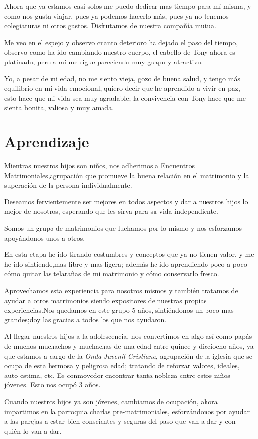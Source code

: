 \documentclass[letterpaper, 12pt]{book}
\begin{document}
Ahora que ya estamos casi solos me puedo dedicar mas tiempo para mí misma, y como nos gusta viajar, pues ya podemos hacerlo más, pues ya no tenemos colegiaturas ni otros gastos. Disfrutamos de nuestra compañía mutua.

Me veo en el espejo y observo cuanto deterioro ha dejado el paso del tiempo, observo como ha ido cambiando nuestro cuerpo, el cabello de Tony ahora es platinado, pero a mí me sigue pareciendo muy guapo y atractivo.

Yo, a pesar de mi edad, no me siento vieja, gozo de buena salud, y tengo más equilibrio en mi vida emocional, quiero decir que he aprendido a vivir en paz, esto hace que mi vida sea muy agradable; la convivencia con Tony hace que me sienta bonita, valiosa y muy amada.
\chapter{Aprendizaje}
Mientras nuestros hijos son niños, nos adherimos a Encuentros Matrimoniales,agrupación que promueve la buena relación en el matrimonio y la superación de la persona individualmente.

Deseamos fervientemente ser mejores en todos aspectos y dar a nuestros hijos lo mejor de nosotros, esperando que les sirva para su vida independiente.

Somos un grupo de matrimonios que luchamos por lo mismo y nos esforzamos apoyándonos unos a otros.

En esta etapa he ido tirando costumbres y conceptos que ya no tienen valor, y me he ido sintiendo,mas libre y mas ligera;
además he ido aprendiendo poco a poco cómo quitar las telarañas de mi matrimonio y cómo conservarlo fresco.

Aprovechamos esta experiencia para nosotros mismos y también tratamos de ayudar a otros matrimonios siendo expositores de nuestras propias experiencias.Nos quedamos en este grupo 5 años, sintiéndonos un poco mas grandes;doy las gracias a todos los que nos ayudaron.

Al llegar nuestros hijos a la adolescencia, nos convertimos en algo así como papás de muchos muchachos y muchachas de una edad entre quince y dieciocho años, ya que estamos a cargo de la {\it Onda Juvenil Cristiana}, agrupación de la iglesia que se ocupa de esta hermosa y peligrosa edad; tratando de reforzar valores, ideales, auto-estima, etc. Es conmovedor encontrar tanta nobleza entre estos niños jóvenes. Esto nos ocupó 3 años.

Cuando nuestros hijos ya son jóvenes, cambiamos de ocupación, ahora impartimos en la parroquia charlas pre-matrimoniales, esforzándonos por ayudar a las parejas a estar bien conscientes y seguras del paso que van a dar y con quién lo van a dar.
\end{document}
